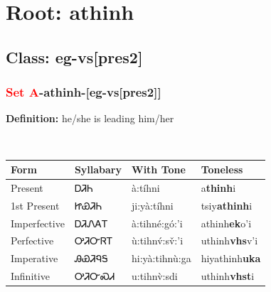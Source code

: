 \needspace{4in}
\section*{Root: athinh}
\nopagebreak
{}
\needspace{3in}
\subsection*{Class: eg-vs[pres2]}
\nopagebreak
\needspace{2in}
\subsubsection*{\textcolor{Red}{Set A}{-}\textbf{athinh}{-}[eg-vs[pres2]]}
\nopagebreak
\textbf{Definition: } he/she is leading him/her
\\[0.5em]
\begin{tabularx}{\textwidth}{l X X X}%
\toprule%
\textbf{Form}&\textbf{Syllabary}&\textbf{With Tone}&\textbf{Toneless}\\%
\midrule%
Present&ᎠᏘᏂ&à:tíhni&a\textbf{thinh}i\\%
1st Present&ᏥᏯᏘᏂ&ji:yà:tíhni&tsiy\textbf{athinh}i\\%
Imperfective&ᎠᏘᏁᎪᎢ&à:tihné:gó:’i&athinh\textbf{ek}o'i\\%
Perfective&ᎤᏘᏅᏒᎢ&ù:tihnv́:sv̌:’i&uthinh\textbf{vhs}v'i\\%
Imperative&ᎯᏯᏘᏄᎦ&hi:yà:tihnù:ga&hiyathinh\textbf{uka}\\%
Infinitive&ᎤᏘᏅᏍᏗ&u:tihnv̀:sdi&uthinh\textbf{vhst}i\\%
\bottomrule%
\end{tabularx}
\\[1em]